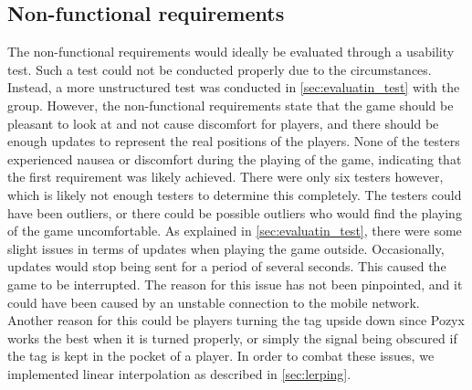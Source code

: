 \subsection{Non-functional requirements}
The non-functional requirements would ideally be evaluated through a usability test.
Such a test could not be conducted properly due to the circumstances.
Instead, a more unstructured test was conducted in \autoref{sec:evaluatin_test} with the group.
However, the non-functional requirements state that the game should be pleasant to look at and not cause discomfort for players, and there should be enough updates to represent the real positions of the players.
None of the testers experienced nausea or discomfort during the playing of the game, indicating that the first requirement was likely achieved.
There were only six testers however, which is likely not enough testers to determine this completely.
The testers could have been outliers, or there could be possible outliers who would find the playing of the game uncomfortable.
As explained in \autoref{sec:evaluatin_test}, there were some slight issues in terms of updates when playing the game outside.
Occasionally, updates would stop being sent for a period of several seconds.
This caused the game to be interrupted.
The reason for this issue has not been pinpointed, and it could have been caused by an unstable connection to the mobile network.
Another reason for this could be players turning the tag upside down since Pozyx works the best when it is turned properly\cite{pozyx-AnchorHeights}, or simply the signal being obscured if the tag is kept in the pocket of a player.
In order to combat these issues, we implemented linear interpolation as described in \autoref{sec:lerping}.